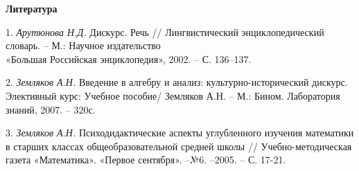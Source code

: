 \smallskip \centerline {\bf Литература} \nopagebreak


1. {\it Арутюнова Н.Д.} Дискурс. Речь // Лингвистический энциклопедический словарь. – М.: Научное издательство \\«Большая Российская энциклопедия», 2002. – С. 136–137.

2. {\it Земляков А.Н.} Введение в алгебру и анализ: культур\-но-исторический дискурс. Элективный курс: Учебное пособие/ Земляков А.Н. – М.: Бином. Лаборатория знаний, 2007. – 320с.

3. {\it Земляков А.Н.}  Психодидактические аспекты углубленного изучения математики в старших классах общеобразовательной средней школы // Учебно-методическая газета «Математика». «Первое сентября». –№6. –2005. – С. 17-21.



